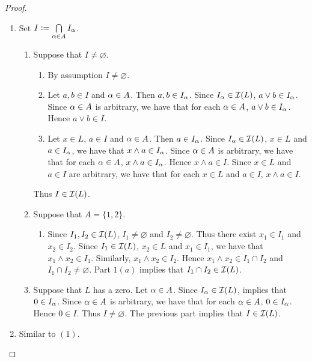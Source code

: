 \documentclass{book}
\begin{document}
	\begin{proof} \
		\begin{enumerate}
			\item Set $I \vcentcolon= \bigcap\limits_{\alpha \in A} I_{\alpha}$.
			\begin{enumerate}
				\item Suppose that $I \neq \varnothing$.
				\begin{enumerate}
					\item By assumption $I \neq \varnothing$.
					\item Let $a, b \in I$ and $\alpha \in A$. Then $a,b \in I_{\alpha}$. Since $I_{\alpha} \in \mathcal{I}(L)$, $a \vee b \in I_{\alpha}$. Since $\alpha \in A$ is arbitrary, we have that for each $\alpha \in A$, $a \vee b \in I_{\alpha}$. Hence $a \vee b \in I$.
					\item Let $x \in L$, $a \in I$ and $\alpha \in A$. Then $a \in I_{\alpha}$. Since $I_{\alpha} \in \mathcal{I}(L)$, $x \in L$ and $a \in I_{\alpha}$, we have that $x \wedge a \in I_{\alpha}$. Since $\alpha \in A$ is arbitrary, we have that for each $\alpha \in A$, $x \wedge a \in I_{\alpha}$. Hence $x \wedge a \in I$. Since $x \in L$ and $a \in I$ are arbitrary, we have that for each $x \in L$ and $a \in I$, $x \wedge a \in I$. 
				\end{enumerate}
				Thus $I \in \mathcal{I}(L)$.
				\item Suppose that $A = \{1,2\}$. 
				\begin{enumerate}
					\item Since $I_1, I_2 \in \mathcal{I}(L)$, $I_1 \neq \varnothing$ and $I_2 \neq \varnothing$. Thus there exist $x_1 \in I_1$ and $x_2 \in I_2$. Since $I_1 \in \mathcal{I}(L)$, $x_2 \in L$ and $x_1 \in I_1$, we have that $x_1 \wedge x_2 \in I_1$. Similarly, $x_1 \wedge x_2 \in I_2$. Hence $x_1 \wedge x_2 \in I_1 \cap I_2$ and $I_1 \cap I_2 \neq \varnothing$. Part $1(a)$ implies that $I_1 \cap I_2 \in \mathcal{I}(L)$.
				\end{enumerate}
				\item Suppose that $L$ has a zero. Let $\alpha \in A$. Since $I_{\alpha} \in \mathcal{I}(L)$,  implies that $0 \in I_{\alpha}$. Since $\alpha \in A$ is arbitrary, we have that for each $\alpha \in A$, $0 \in I_{\alpha}$. Hence $0 \in I$. Thus $I \neq \varnothing$. The previous part implies that $I \in \mathcal{I}(L)$.
			\end{enumerate}
			\item Similar to $(1)$.
		\end{enumerate}
	\end{proof}
	
\end{document}
